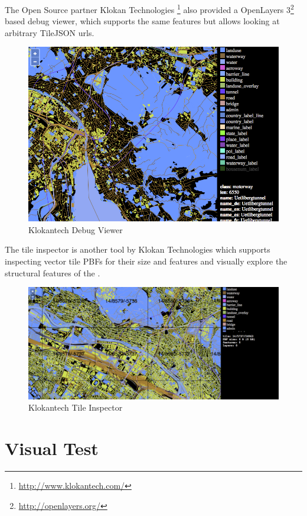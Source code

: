 The Open Source partner Klokan Technologies \footnote{\url{http://www.klokantech.com/}} also provided a OpenLayers 3\footnote{\url{http://openlayers.org/}} based debug viewer,
which supports the same features but allows looking at arbitrary TileJSON urls.

\begin{figure}[H]
\centering
  \includegraphics[width=1\textwidth]{images/klokantech_debug_viewer.png}
  \caption{Klokantech Debug Viewer}
\end{figure}
The tile inspector is another tool by Klokan Technologies which supports inspecting vector tile PBFs for their size and features and visually explore the structural features of the .

\begin{figure}[H]
\centering
  \includegraphics[width=1\textwidth]{images/klokantech_tile_inspector.png}
  \caption{Klokantech Tile Inspector}
\end{figure}



\section{Visual Test}

